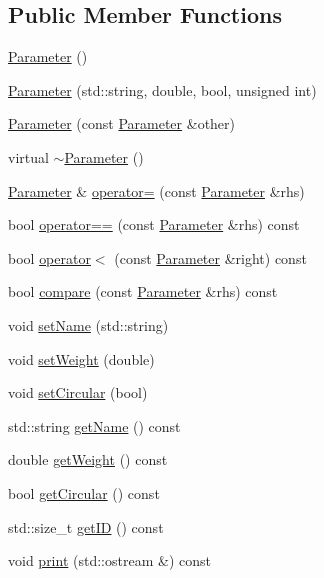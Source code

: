\subsection*{Public Member Functions}
\begin{DoxyCompactItemize}
\item 
\mbox{\hyperlink{class_parameter_a5ba93ca36c3261d3850e67f92717c2f5}{Parameter}} ()
\item 
\mbox{\hyperlink{class_parameter_a1d0a0e3024d6cdac044398afbff979e3}{Parameter}} (std\+::string, double, bool, unsigned int)
\item 
\mbox{\hyperlink{class_parameter_ad3f5d861da24673d97bd1bd206b0b89a}{Parameter}} (const \mbox{\hyperlink{class_parameter}{Parameter}} \&other)
\item 
virtual \mbox{\hyperlink{class_parameter_a6e2ade42a712f1d3675653329266e42d}{$\sim$\+Parameter}} ()
\item 
\mbox{\hyperlink{class_parameter}{Parameter}} \& \mbox{\hyperlink{class_parameter_a3bd55c637ccb3891e09cfa4a6bec91f5}{operator=}} (const \mbox{\hyperlink{class_parameter}{Parameter}} \&rhs)
\item 
bool \mbox{\hyperlink{class_parameter_ada4106ab9962e61d1aecf5bf032290c3}{operator==}} (const \mbox{\hyperlink{class_parameter}{Parameter}} \&rhs) const
\item 
bool \mbox{\hyperlink{class_parameter_a4f7b83d21a705a91947da01166c3f799}{operator$<$}} (const \mbox{\hyperlink{class_parameter}{Parameter}} \&right) const
\item 
bool \mbox{\hyperlink{class_parameter_adb0e139c6aeaedc4ee1e9432d464e9bc}{compare}} (const \mbox{\hyperlink{class_parameter}{Parameter}} \&rhs) const
\item 
void \mbox{\hyperlink{class_parameter_af399de059c88d2ae0b27afd3cb998261}{set\+Name}} (std\+::string)
\item 
void \mbox{\hyperlink{class_parameter_ad0682af0270bd689cfa0e571dd58138d}{set\+Weight}} (double)
\item 
void \mbox{\hyperlink{class_parameter_a77543a69497a6da692c76707207a6562}{set\+Circular}} (bool)
\item 
std\+::string \mbox{\hyperlink{class_parameter_aedb83bcd926fb8df7dc5ee31a1066baa}{get\+Name}} () const
\item 
double \mbox{\hyperlink{class_parameter_a2fcb32200dafaa276b7a1ca61f135f72}{get\+Weight}} () const
\item 
bool \mbox{\hyperlink{class_parameter_a8f0f2e92941e8bbae49de6388c87fdf8}{get\+Circular}} () const
\item 
std\+::size\+\_\+t \mbox{\hyperlink{class_parameter_a12c2b322265422eea431043dd50f047d}{get\+ID}} () const
\item 
void \mbox{\hyperlink{class_parameter_a93bd0debbfe144b2c1dd68aca79adfb2}{print}} (std\+::ostream \&) const
\end{DoxyCompactItemize}
